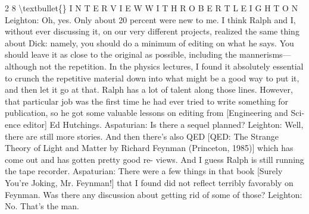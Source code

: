 \documentclass[10pt,oneside]{article}
\begin{document}
2 8 \textbackslash{}textbullet\{\} I N T E R V I E W  W I T H  R O B E R T  L E I G H T O N Leighton: Oh, yes. Only about 20 percent were new to me. I think Ralph and I, without ever discussing it, on our very different projects, realized the same thing about Dick: namely, you should do a minimum of editing on what he says. You should leave it as close to the original as possible, including the mannerisms---although not the repetition. In the physics lectures, I found it absolutely essential to crunch the repetitive material down into what might be a good way to put it, and then let it go at that. Ralph has a lot of talent along those lines. However, that particular job was the first time he had ever tried to write something for publication, so he got some valuable lessons on editing from [Engineering and Sci- ence editor] Ed Hutchings. Aspaturian: Is there a sequel planned? Leighton: Well, there are still more stories. And then there’s also QED [QED: The Strange Theory of Light and Matter by Richard Feynman (Princeton, 1985)] which has come out and has gotten pretty good re- views. And I guess Ralph is still running the tape recorder. Aspaturian: There were a few things in that book [Surely You’re Joking, Mr. Feynman!] that I found did not reflect terribly favorably on Feynman. Was there any discussion about getting rid of some of those? Leighton: No. That’s the man.\par

\clearpage
{}
\end{document}
